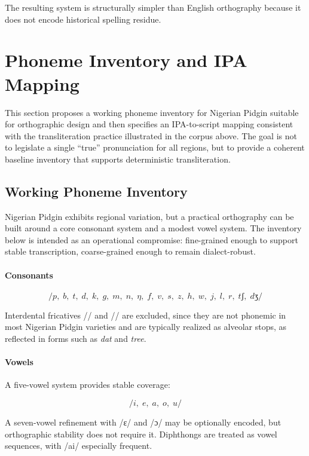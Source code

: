 \documentclass[12pt]{article}
\begin{document}
The resulting system is structurally simpler than English orthography because it does not encode historical spelling residue.

\section{Phoneme Inventory and IPA Mapping}

This section proposes a working phoneme inventory for Nigerian Pidgin suitable for orthographic design and then specifies an IPA-to-script mapping consistent with the transliteration practice illustrated in the corpus above. The goal is not to legislate a single ``true'' pronunciation for all regions, but to provide a coherent baseline inventory that supports deterministic transliteration.

\subsection{Working Phoneme Inventory}

Nigerian Pidgin exhibits regional variation, but a practical orthography can be built around a core consonant system and a modest vowel system. The inventory below is intended as an operational compromise: fine-grained enough to support stable transcription, coarse-grained enough to remain dialect-robust.

\paragraph{Consonants}

\[
/p,\; b,\; t,\; d,\; k,\; g,\;
m,\; n,\; \eta,\;
f,\; v,\; s,\; z,\; h,\;
w,\; j,\;
l,\; r,\;
tʃ,\; dʒ/
\]

Interdental fricatives /\texttheta/ and /\dh/ are excluded, since they are not phonemic in most Nigerian Pidgin varieties and are typically realized as alveolar stops, as reflected in forms such as \textit{dat} and \textit{tree}.

\paragraph{Vowels}

A five-vowel system provides stable coverage:

\[
/i,\; e,\; a,\; o,\; u/
\]

A seven-vowel refinement with /ɛ/ and /ɔ/ may be optionally encoded, but orthographic stability does not require it. Diphthongs are treated as vowel sequences, with /ai/ especially frequent.
\end{document}
